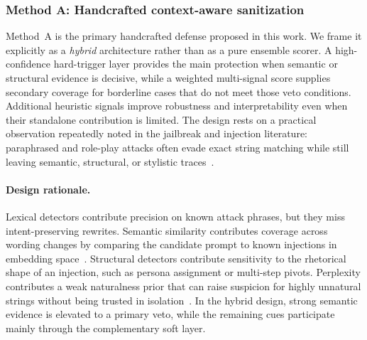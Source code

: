 \documentclass{article}
\begin{document}
\subsubsection{Method A: Handcrafted context-aware sanitization}
\label{sec:method-a}

Method~A is the primary handcrafted defense proposed in this work.
We frame it explicitly as a \emph{hybrid} architecture rather than as a pure ensemble scorer.
A high-confidence hard-trigger layer provides the main protection when semantic or structural evidence is decisive, while a weighted multi-signal score supplies secondary coverage for borderline cases that do not meet those veto conditions.
Additional heuristic signals improve robustness and interpretability even when their standalone contribution is limited.
The design rests on a practical observation repeatedly noted in the jailbreak and injection literature: paraphrased and role-play attacks often evade exact string matching while still leaving semantic, structural, or stylistic traces~\cite{wang2025promptsleuth,kholkar2025capture,yi2024jailbreak,bair2025prompt}.

\paragraph{Design rationale.}
Lexical detectors contribute precision on known attack phrases, but they miss intent-preserving rewrites.
Semantic similarity contributes coverage across wording changes by comparing the candidate prompt to known injections in embedding space~\cite{reimers2019sentence,wang2020minilm}.
Structural detectors contribute sensitivity to the rhetorical shape of an injection, such as persona assignment or multi-step pivots.
Perplexity contributes a weak naturalness prior that can raise suspicion for highly unnatural strings without being trusted in isolation~\cite{radford2019language}.
In the hybrid design, strong semantic evidence is elevated to a primary veto, while the remaining cues participate mainly through the complementary soft layer.
\end{document}
